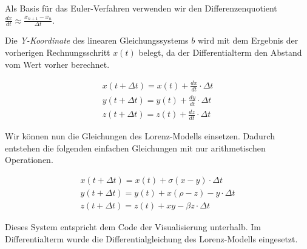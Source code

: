 Als Basis für das Euler-Verfahren verwenden wir den Differenzenquotient $ \frac{dx}{dt} \approx \frac{x_{n + 1} - x_n}{\Delta t} $. 



Die \textit{Y-Koordinate} des linearen Gleichungssystems $ b $ wird mit dem Ergebnis der vorherigen Rechnungsschritt $ x(t) $ belegt, da der Differentialterm den Abstand vom Wert vorher berechnet.

\begin{align}
    x(t+ \Delta t) = x(t) + \frac{dx}{dt} \cdot \Delta t\\
    y(t + \Delta t) = y(t) + \frac{dy}{dt} \cdot \Delta t\\
    z(t + \Delta t) = z(t) + \frac{dz}{dt} \cdot \Delta t
\end{align}

Wir können nun die Gleichungen des Lorenz-Modells einsetzen. Dadurch entstehen die folgenden einfachen Gleichungen mit nur arithmetischen Operationen.

\begin{align}
    x(t + \Delta t) = x(t) + \sigma(x - y) \cdot \Delta t\\
    y(t + \Delta t) = y(t) + x(\rho - z) - y \cdot \Delta t\\
    z(t + \Delta t) = z(t) + xy - \beta z \cdot \Delta t
\end{align}

Dieses System entspricht dem Code der Visualisierung unterhalb. Im Differentialterm wurde die Differentialgleichung des Lorenz-Modells eingesetzt.
